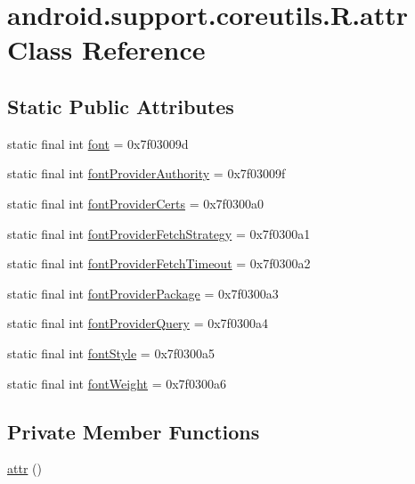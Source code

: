 \hypertarget{classandroid_1_1support_1_1coreutils_1_1_r_1_1attr}{}\section{android.\+support.\+coreutils.\+R.\+attr Class Reference}
\label{classandroid_1_1support_1_1coreutils_1_1_r_1_1attr}
\subsection*{Static Public Attributes}
\begin{DoxyCompactItemize}
\item 
static final int \mbox{\hyperlink{classandroid_1_1support_1_1coreutils_1_1_r_1_1attr_a4c489a82e7e8fd81bb99423b6b0f8770}{font}} = 0x7f03009d
\item 
static final int \mbox{\hyperlink{classandroid_1_1support_1_1coreutils_1_1_r_1_1attr_a145db22aa419474281d301892c204dab}{font\+Provider\+Authority}} = 0x7f03009f
\item 
static final int \mbox{\hyperlink{classandroid_1_1support_1_1coreutils_1_1_r_1_1attr_a08e7fefed18115b7cf844cb2e454d2e0}{font\+Provider\+Certs}} = 0x7f0300a0
\item 
static final int \mbox{\hyperlink{classandroid_1_1support_1_1coreutils_1_1_r_1_1attr_af344c37d405b3d7b00fb99753445a715}{font\+Provider\+Fetch\+Strategy}} = 0x7f0300a1
\item 
static final int \mbox{\hyperlink{classandroid_1_1support_1_1coreutils_1_1_r_1_1attr_a17b974df2f12a142fdc7448b71f2efbc}{font\+Provider\+Fetch\+Timeout}} = 0x7f0300a2
\item 
static final int \mbox{\hyperlink{classandroid_1_1support_1_1coreutils_1_1_r_1_1attr_a2a233565e2dd7dd918cd046a6655fe18}{font\+Provider\+Package}} = 0x7f0300a3
\item 
static final int \mbox{\hyperlink{classandroid_1_1support_1_1coreutils_1_1_r_1_1attr_a79e49416ddb757a842e56544cb28a6d7}{font\+Provider\+Query}} = 0x7f0300a4
\item 
static final int \mbox{\hyperlink{classandroid_1_1support_1_1coreutils_1_1_r_1_1attr_a9b35d3307670f8ef6f267a5b6d5bfc29}{font\+Style}} = 0x7f0300a5
\item 
static final int \mbox{\hyperlink{classandroid_1_1support_1_1coreutils_1_1_r_1_1attr_a7c873eec8f29f4228759f62bbcd2969d}{font\+Weight}} = 0x7f0300a6
\end{DoxyCompactItemize}
\subsection*{Private Member Functions}
\begin{DoxyCompactItemize}
\item 
\mbox{\hyperlink{classandroid_1_1support_1_1coreutils_1_1_r_1_1attr_a450a5815fd001f8205ca8028dbff5b23}{attr}} ()
\end{DoxyCompactItemize}



